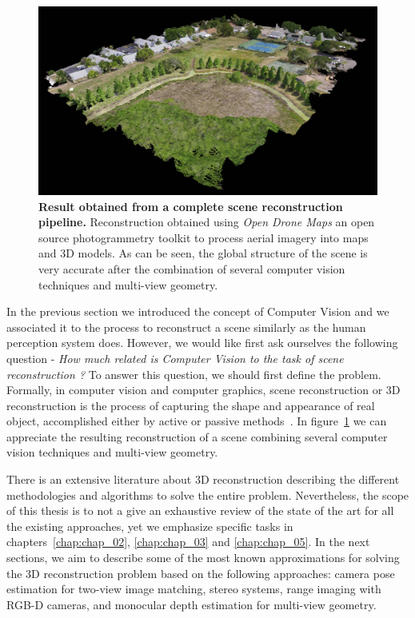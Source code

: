 \begin{figure}[t!]
	\centering
	\includegraphics[width=\textwidth]{main/introduction/images/odm_reconstruction.jpg}
	\caption[Result obtained from a complete scene reconstruction pipeline]{\textbf{Result obtained from a complete scene reconstruction pipeline.} Reconstruction obtained using \textit{Open Drone Maps} an open source photogrammetry toolkit to process aerial imagery into maps and 3D models. As can be seen, the global structure of the scene is very accurate after the combination of several computer vision techniques and multi-view geometry. }
	\label{fig:intro_odm_reconstruction}
\end{figure}

In the previous section we introduced the concept of Computer Vision and we associated it to the process to reconstruct a scene similarly as the human perception system does. However, we would like first ask ourselves the following question - \textit{How much related is Computer Vision to the task of scene reconstruction ?} To answer this question, we should first define the problem. Formally, in computer vision and computer graphics, scene reconstruction or 3D reconstruction is the process of capturing the shape and appearance of real object, accomplished either by active or passive methods~\cite{moons2009}. In figure~\ref{fig:intro_odm_reconstruction} we can appreciate the resulting reconstruction of a scene combining several computer vision techniques and multi-view geometry. 

There is an extensive literature about 3D reconstruction describing the  different methodologies and algorithms to solve the entire problem. Nevertheless, the scope of this thesis is to not a give an exhaustive review of the state of the art for all the existing approaches, yet we emphasize specific tasks in chapters~\ref{chap:chap_02}, \ref{chap:chap_03} and \ref{chap:chap_05}. In the next sections, we aim to describe some of the most known approximations for solving the 3D reconstruction problem based on the following approaches: camera pose estimation for two-view image matching, stereo systems, range imaging with RGB-D cameras, and monocular depth estimation for multi-view geometry.

